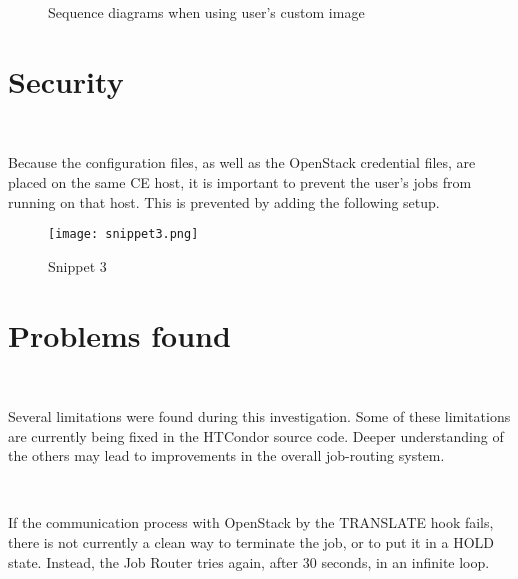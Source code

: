 \documentclass[a4paper]{jpconf}
\begin{document}
\begin{figure}[h]
    \centering
    \qquad
    \caption{Sequence diagrams when using user's custom image}%
    \label{fig:custom}%
\end{figure}


\section{Security}

~

Because the configuration files, as well as the OpenStack credential files, 
are placed on the same CE host, it is important to prevent the user's jobs from running on that host.
This is prevented by adding the following setup.


\begin{figure}[h]
    \centering
    \texttt{[image: snippet3.png]}
    \caption{Snippet 3}
    \label{fig:snippet3}
\end{figure}



\section{Problems found}

~

Several limitations were found during this investigation.
Some of these limitations are currently being fixed in the HTCondor source code.
Deeper understanding of the others may lead to improvements in the overall
job-routing system.

~

If the communication process with OpenStack by the TRANSLATE hook fails, 
there is not currently a clean way to terminate the job, or to put it in a HOLD
state. Instead, the Job Router tries again, after 30 seconds, in an infinite loop.
\end{document}
